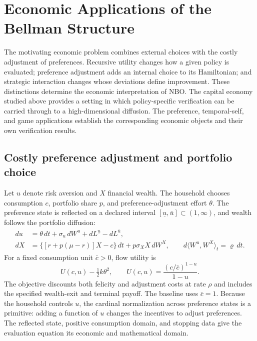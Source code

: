 \section{Economic Applications of the Bellman Structure}\label{sec:economic-scope}
The motivating economic problem combines external choices with the costly adjustment of preferences. Recursive utility changes how a given policy is evaluated; preference adjustment adds an internal choice to its Hamiltonian; and strategic interaction changes whose deviations define improvement. These distinctions determine the economic interpretation of NBO. The capital economy studied above provides a setting in which policy-specific verification can be carried through to a high-dimensional diffusion. The preference, temporal-self, and game applications establish the corresponding economic objects and their own verification results.

\subsection{Costly preference adjustment and portfolio choice}
Let $u$ denote risk aversion and $X$ financial wealth. The household chooses consumption $c$, portfolio share $p$, and preference-adjustment effort $\theta$. The preference state is reflected on a declared interval $[\underline u,\bar u]\subset(1,\infty)$, and wealth follows the portfolio diffusion:
\begin{align}
 du&=\theta\,dt+\sigma_u\,dW^u+dL^{\underline u}-dL^{\bar u},\nonumber\\
 dX&=\{[r+p(\mu-r)]X-c\}\,dt+p\sigma_X X\,dW^X,
 \qquad d\langle W^u,W^X\rangle_t=\varrho\,dt.\label{eq:scope-preferences}
\end{align}
For a fixed consumption unit $\bar c>0$, flow utility is
\[
 U(c,u)-\tfrac12k\theta^2,
 \qquad U(c,u)=\frac{(c/\bar c)^{1-u}}{1-u}.
\]
The objective discounts both felicity and adjustment costs at rate $\rho$ and includes the specified wealth-exit and terminal payoff. The baseline uses $\bar c=1$. Because the household controls $u$, the cardinal normalization across preference states is a primitive: adding a function of $u$ changes the incentives to adjust preferences. The reflected state, positive consumption domain, and stopping data give the evaluation equation its economic and mathematical domain.

